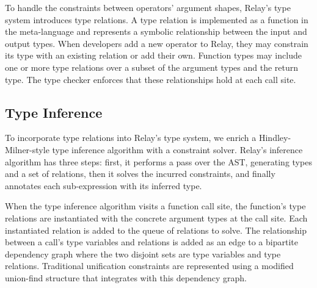 To handle the constraints between operators' argument shapes, Relay's type system
  introduces type relations.
A type relation is implemented as a function in the
  meta-language and represents a symbolic relationship between
  the input and output types.
When developers add a new operator to Relay, they may constrain its
  type with an existing relation or add their own.
Function types may include
  one or more type relations over a subset of the argument types and the return type.
The type checker enforces that these relationships hold at each call site.

\subsection*{Type Inference}
\label{sec:inference}

To incorporate type relations into Relay's type system, we enrich
  a Hindley-Milner-style type inference algorithm with
  a constraint solver.
Relay's inference algorithm has three steps: first, it
  performs a pass over the AST, generating types and a set of relations,
  then it solves the incurred constraints,
  and finally annotates each sub-expression with its inferred type.


When the type inference algorithm visits a function call site, the function's type relations are
  instantiated with the concrete argument types at the call site.
Each instantiated relation is added to the queue of relations to solve.
The relationship between a call's type variables and relations is added as an edge to
  a bipartite dependency graph where the two disjoint sets are type variables and type relations.
Traditional unification constraints are represented using a modified union-find structure that
  integrates with this dependency graph.

